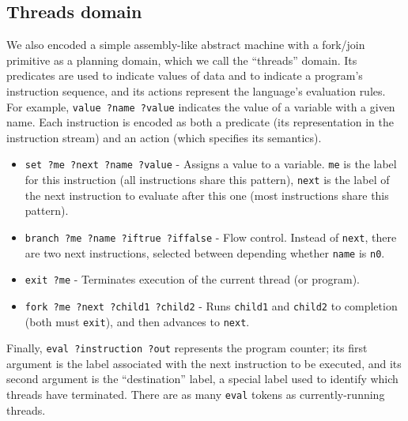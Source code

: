 \subsection{Threads domain}

We also encoded a simple assembly-like abstract machine with a fork/join primitive as a planning domain, which we call the ``threads'' domain.
Its predicates are used to indicate values of data and to indicate a program's instruction sequence, and
its actions represent the language's evaluation rules. For example, \texttt{value ?name ?value} indicates the value of a variable with a given name. Each instruction is encoded as both a predicate (its representation in the instruction stream) and an action (which specifies its semantics).
%
\begin{itemize}
	\item \texttt{set ?me ?next ?name ?value} - Assigns a value to a variable. \texttt{me} is the label for this instruction (all instructions share this pattern), \texttt{next} is the label of the next instruction to evaluate after this one (most instructions share this pattern).
	\item \texttt{branch ?me ?name ?iftrue ?iffalse} - Flow control. Instead of \texttt{next}, there are two next instructions, selected between depending whether \texttt{name} is \texttt{n0}.
	\item \texttt{exit ?me} - Terminates execution of the current thread (or program).
	\item \texttt{fork ?me ?next ?child1 ?child2} - Runs \texttt{child1} and \texttt{child2} to completion (both must \texttt{exit}), and then advances to \texttt{next}.
\end{itemize}
%
Finally, \texttt{eval ?instruction ?out} represents the program counter; its first argument is the label associated with the next instruction to be executed, and its second argument is the ``destination'' label, a special label used to identify which threads have terminated. There are as many \texttt{eval} tokens as currently-running threads.

